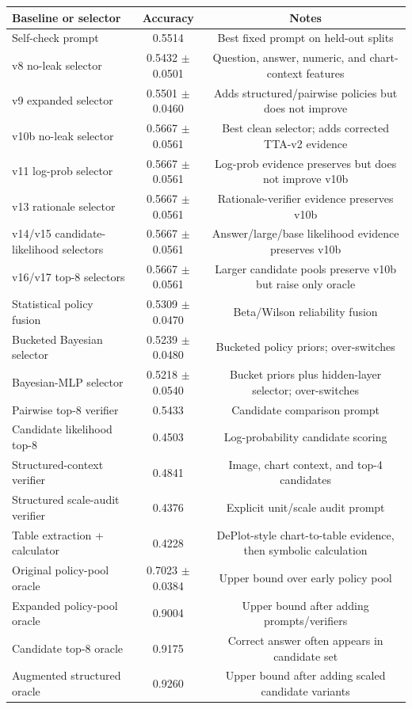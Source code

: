 \begin{tabular}{lcc}
\toprule
Baseline or selector & Accuracy & Notes \\
\midrule
Self-check prompt & 0.5514 & Best fixed prompt on held-out splits \\
v8 no-leak selector & 0.5432 $\pm$ 0.0501 & Question, answer, numeric, and chart-context features \\
v9 expanded selector & 0.5501 $\pm$ 0.0460 & Adds structured/pairwise policies but does not improve \\
v10b no-leak selector & 0.5667 $\pm$ 0.0561 & Best clean selector; adds corrected TTA-v2 evidence \\
v11 log-prob selector & 0.5667 $\pm$ 0.0561 & Log-prob evidence preserves but does not improve v10b \\
v13 rationale selector & 0.5667 $\pm$ 0.0561 & Rationale-verifier evidence preserves v10b \\
v14/v15 candidate-likelihood selectors & 0.5667 $\pm$ 0.0561 & Answer/large/base likelihood evidence preserves v10b \\
v16/v17 top-8 selectors & 0.5667 $\pm$ 0.0561 & Larger candidate pools preserve v10b but raise only oracle \\
Statistical policy fusion & 0.5309 $\pm$ 0.0470 & Beta/Wilson reliability fusion \\
Bucketed Bayesian selector & 0.5239 $\pm$ 0.0480 & Bucketed policy priors; over-switches \\
Bayesian-MLP selector & 0.5218 $\pm$ 0.0540 & Bucket priors plus hidden-layer selector; over-switches \\
Pairwise top-8 verifier & 0.5433 & Candidate comparison prompt \\
Candidate likelihood top-8 & 0.4503 & Log-probability candidate scoring \\
Structured-context verifier & 0.4841 & Image, chart context, and top-4 candidates \\
Structured scale-audit verifier & 0.4376 & Explicit unit/scale audit prompt \\
Table extraction + calculator & 0.4228 & DePlot-style chart-to-table evidence, then symbolic calculation \\
\midrule
Original policy-pool oracle & 0.7023 $\pm$ 0.0384 & Upper bound over early policy pool \\
Expanded policy-pool oracle & 0.9004 & Upper bound after adding prompts/verifiers \\
Candidate top-8 oracle & 0.9175 & Correct answer often appears in candidate set \\
Augmented structured oracle & 0.9260 & Upper bound after adding scaled candidate variants \\
\bottomrule
\end{tabular}

